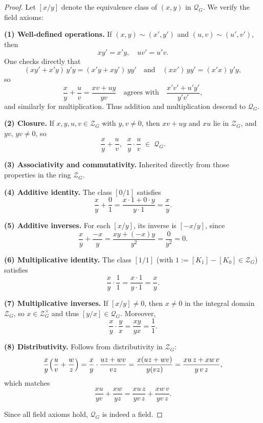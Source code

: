 \documentclass[11pt]{article}
\theoremstyle{definition}
\theoremstyle{plain}
\theoremstyle{remark}
\begin{document}
\begin{proof}
Let $[x/y]$ denote the equivalence class of $(x,y)$ in $\mathcal{Q}_G$.  We verify the field axioms:

\medskip
\noindent\textbf{(1) Well‑defined operations.}
If $(x,y)\sim(x',y')$ and $(u,v)\sim(u',v')$, then
\[
xy'=x'y,\quad uv'=u'v.
\]
One checks directly that
\[
(xy'+x'y)\,y'y = (x'y+xy')\,yy' 
\quad\text{and}\quad
(xx')\,yy'=(x'x)\,y'y,
\]
so
\[
\frac{x}{y}+\frac{u}{v}
=\frac{xv+uy}{yv}
\quad\text{agrees with}\quad
\frac{x'v'+u'y'}{y'v'},
\]
and similarly for multiplication.  Thus addition and multiplication descend to $\mathcal{Q}_G$.

\medskip
\noindent\textbf{(2) Closure.}
If $x,y,u,v\in\mathcal{Z}_G$ with $y,v\neq0$, then $xv+uy$ and $x u$ lie in $\mathcal{Z}_G$, and $yv,\,yv\neq0$, so
\[
\frac{x}{y}+\frac{u}{v},\;\;
\frac{x}{y}\cdot\frac{u}{v}
\;\in\;\mathcal{Q}_G.
\]

\medskip
\noindent\textbf{(3) Associativity and commutativity.}
Inherited directly from those properties in the ring $\mathcal{Z}_G$.

\medskip
\noindent\textbf{(4) Additive identity.}
The class $[0/1]$ satisfies
\[
\frac{x}{y} + \frac{0}{1} = \frac{x\cdot1 + 0\cdot y}{y\cdot1} = \frac{x}{y}.
\]

\medskip
\noindent\textbf{(5) Additive inverses.}
For each $[x/y]$, its inverse is $[-x/y]$, since
\[
\frac{x}{y} + \frac{-x}{y} = \frac{xy + (-x)y}{y^2} = \frac{0}{y^2} = 0.
\]

\medskip
\noindent\textbf{(6) Multiplicative identity.}
The class $[1/1]$ (with $1 := [K_1]-[K_0]\in\mathcal{Z}_G$) satisfies
\[
\frac{x}{y}\cdot\frac{1}{1}
= \frac{x\cdot1}{y\cdot1}
= \frac{x}{y}.
\]

\medskip
\noindent\textbf{(7) Multiplicative inverses.}
If $[x/y]\neq0$, then $x\neq0$ in the integral domain $\mathcal{Z}_G$, so $x\in\mathcal{Z}_G^\times$ and thus $[y/x]\in\mathcal{Q}_G$.  Moreover,
\[
\frac{x}{y}\cdot\frac{y}{x}=\frac{xy}{yx}=\frac{1}{1}.
\]

\medskip
\noindent\textbf{(8) Distributivity.}
Follows from distributivity in $\mathcal{Z}_G$:
\[
\frac{x}{y}\Bigl(\frac{u}{v}+\frac{w}{z}\Bigr)
=\frac{x}{y}\cdot\frac{uz + wv}{vz}
=\frac{x(uz + wv)}{y(vz)}
=\frac{xu\,z + xw\,v}{y\,v\,z},
\]
which matches
\[
\frac{xu}{yv} + \frac{xw}{yz}
=\frac{x u\,z}{y v\,z} + \frac{x w\,v}{y v\,z}.
\]

Since all field axioms hold, $\mathcal{Q}_G$ is indeed a field.
\end{proof}
\end{document}
